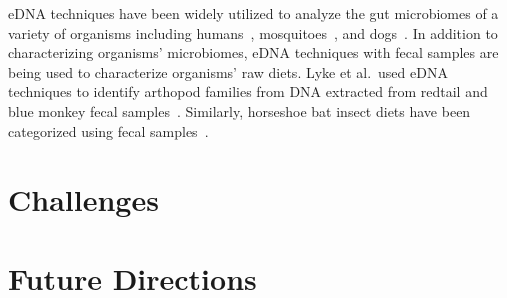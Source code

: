 \documentclass[letterpaper, 10pt, hidelinks]{article}
\begin{document}
eDNA techniques have been widely utilized to analyze the gut microbiomes of a variety of 
organisms including humans~\cite{Turnbaugh2009}, mosquitoes~\cite{Osei-Poku2012}, and
dogs~\cite{Swanson2011}. In addition to characterizing organisms' microbiomes, eDNA 
techniques with fecal samples are being used to characterize organisms' raw diets. 
Lyke et al.\ used eDNA techniques to identify arthopod families from DNA extracted 
from redtail and blue monkey fecal samples~\cite{Lyke2019}. Similarly, horseshoe bat 
insect diets have been categorized using fecal samples~\cite{Aldasoro2019}.

\section{Challenges}

\section{Future Directions}

{}

\end{document}

